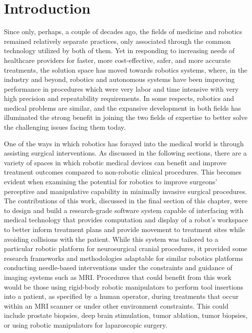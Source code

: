 \documentclass[12pt]{report}
\begin{document}
\chapter{Introduction}
\label{sec:intro}
Since only, perhaps, a couple of decades ago, the fields of medicine and robotics remained relatively separate practices, only associated through the common technology utilized by both of them. Yet in responding to increasing needs of healthcare providers for faster, more cost-effective, safer, and more accurate treatments, the solution space has moved towards robotics systems, where, in the industry and beyond, robotics and autonomous systems have been improving performance in procedures which were very labor and time intensive with very high precision and repeatability requirements. In some respects, robotics and medical problems are similar, and the expansive development in both fields has illuminated the strong benefit in joining the two fields of expertise to better solve the challenging issues facing them today.

One of the ways in which robotics has forayed into the medical world is through assisting surgical interventions. As discussed in the following sections, there are a variety of spaces in which robotic medical devices can benefit and improve treatment outcomes compared to non-robotic clinical procedures. This becomes evident when examining the potential for robotics to improve surgeons' perceptive and manipulative capability in minimally invasive surgical procedures. The contributions of this work, discussed in the final section of this chapter, were to design and build a research-grade software system capable of interfacing with medical technology that provides computation and display of a robot's workspace to better inform treatment plans and provide movement to treatment sites while avoiding collisions with the patient. While this system was tailored to a particular robotic platform for neurosurgical cranial procedures, it provided some research frameworks and methodologies adaptable for similar robotics platforms conducting needle-based interventions under the constraints and guidance of imaging systems such as MRI. Procedures that could benefit from this work would be those using rigid-body robotic manipulators to perform tool insertions into a patient, as specified by a human operator, during treatments that occur within an MRI scanner or under other environment constraints. This could include prostate biopsies, deep brain stimulation, tumor ablation, tumor biopsies, or using robotic manipulators for laparoscopic surgery.
\end{document}
